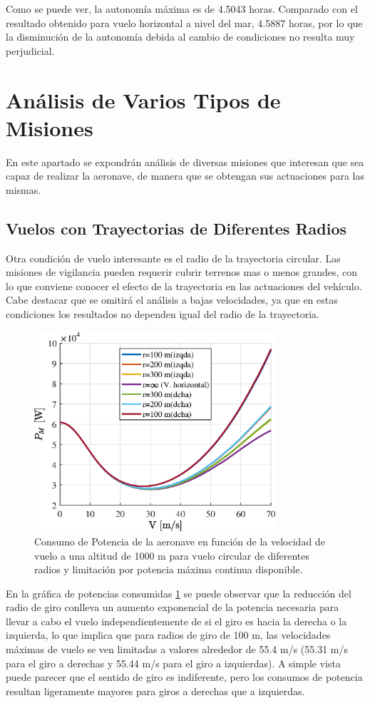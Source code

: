 Como se puede ver, la autonomía máxima es de 4.5043 horas. Comparado con el resultado obtenido para vuelo horizontal a nivel del mar, 4.5887 horas, por lo que la disminución de la autonomía debida al cambio de condiciones no resulta muy perjudicial.

\section{Análisis de Varios Tipos de Misiones}

En este apartado se expondrán análisis de diversas misiones que interesan que sea capaz de realizar la aeronave, de manera que se obtengan sus actuaciones para las mismas.

\subsection*{Vuelos con Trayectorias de Diferentes Radios}

Otra condición de vuelo interesante es el radio de la trayectoria circular. Las misiones de vigilancia pueden requerir cubrir terrenos mas o menos grandes, con lo que conviene conocer el efecto de la trayectoria en las actuaciones del vehículo. Cabe destacar que se omitirá el análisis a bajas velocidades, ya que en estas condiciones los resultados no dependen igual del radio de la trayectoria.

\begin{figure}
	\centering
	\includegraphics[width=90mm]{graficos/PMVCcs}
	\caption{Consumo de Potencia de la aeronave en función de la velocidad de vuelo a una altitud de 1000 m para vuelo circular de diferentes radios y limitación por potencia máxima continua disponible.}
	\label{PMVCcs}
\end{figure}

En la gráfica de potencias consumidas \ref{PMVCcs} se puede observar que la reducción del radio de giro conlleva un aumento exponencial de la potencia necesaria para llevar a cabo el vuelo independientemente de si el giro es hacia la derecha o la izquierda, lo que implica que para radios de giro de 100 m, las velocidades máximas de vuelo se ven limitadas a valores alrededor de 55.4 m/s (55.31 m/s para el giro a derechas y 55.44 m/s para el giro a izquierdas). A simple vista puede parecer que el sentido de giro es indiferente, pero los consumos de potencia resultan ligeramente mayores para giros a derechas que a izquierdas.


